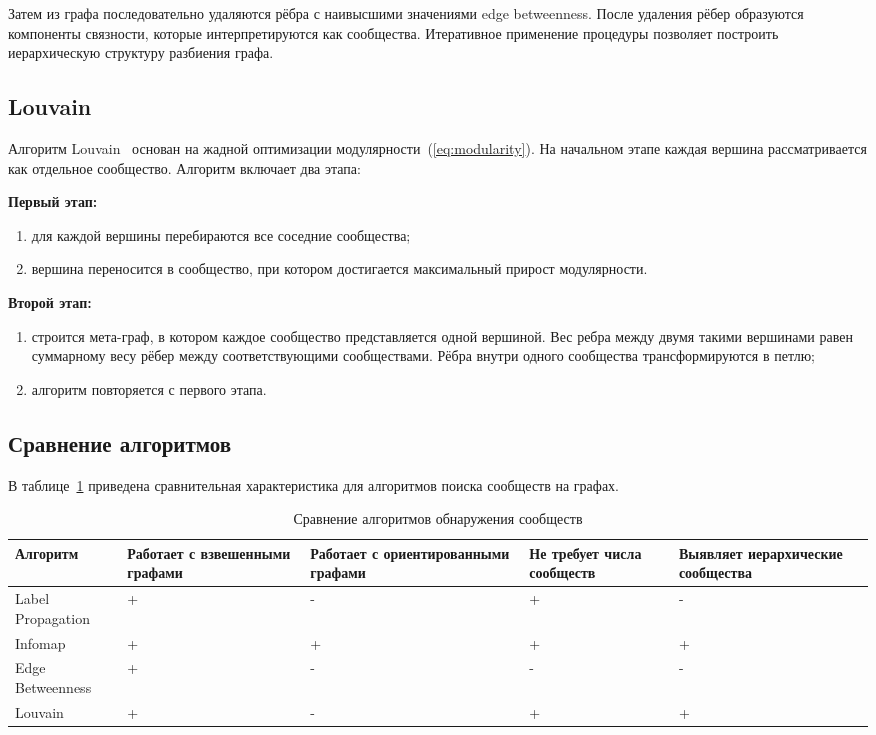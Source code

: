 Затем из графа последовательно удаляются рёбра с наивысшими значениями edge betweenness. После удаления рёбер образуются компоненты связности, которые интерпретируются как сообщества. Итеративное применение процедуры позволяет построить иерархическую структуру разбиения графа.

\subsection{Louvain}

Алгоритм Louvain~\cite{louv} основан на жадной оптимизации модулярности~(\ref{eq:modularity}). На начальном этапе каждая вершина рассматривается как отдельное сообщество. Алгоритм включает два этапа:

\textbf{Первый этап:}
\begin{enumerate}
	\item для каждой вершины перебираются все соседние сообщества;
	\item вершина переносится в сообщество, при котором достигается максимальный прирост модулярности.
\end{enumerate}

\textbf{Второй этап:}
\begin{enumerate}
	\item строится мета-граф, в котором каждое сообщество представляется одной вершиной. Вес ребра между двумя такими вершинами равен суммарному весу рёбер между соответствующими сообществами. Рёбра внутри одного сообщества трансформируются в петлю;
	\item алгоритм повторяется с первого этапа.
\end{enumerate}

\subsection{Сравнение алгоритмов}

В таблице~\ref{tbl:srav_transposed} приведена сравнительная характеристика для алгоритмов поиска сообществ на графах.

\begin{table}[H]
	\begin{center}
		\begin{threeparttable}
			\caption{Сравнение алгоритмов обнаружения сообществ}
			\label{tbl:srav_transposed}
			\begin{tabularx}{\textwidth}{|X|X|X|X|p{2.7cm}|}
				\hline
				\textbf{Алгоритм} & \textbf{Работает с взвешенными графами} & \textbf{Работает с ориентированными графами} & \textbf{Не требует числа сообществ} & \textbf{Выявляет иерархические сообщества} \\
				\hline
				Label Propagation & + & - & + & - \\
				\hline
				Infomap           & + & + & + & + \\
				\hline
				Edge Betweenness  & + & - & - & -\\
				\hline
				Louvain           & + & - & + & + \\
				\hline
			\end{tabularx}
		\end{threeparttable}
	\end{center}
\end{table}

